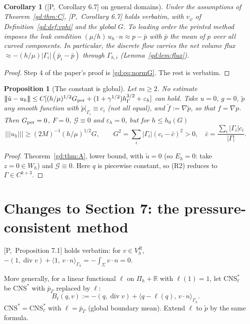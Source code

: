 \documentclass[11pt,reqno]{amsart}
\theoremstyle{plain}
\newtheorem{proposition}[theorem]{Proposition}
\newtheorem{corollary}[theorem]{Corollary}
\theoremstyle{definition}
\newcommand{\R}{\mathbb R}
\newcommand{\hG}{h_\Gamma}
\newcommand{\Gh}{\Gamma_h}
\newcommand{\VR}{V_h^R}
\newcommand{\Pih}{\Pi_h}
\newcommand{\Wh}{W_h}
\newcommand{\ut}{\tilde u}
\newcommand{\pt}{\tilde p}
\newcommand{\ft}{\tilde f}
\newcommand{\pbar}{\bar p}
\newcommand{\pbG}{\bar p_{\Gamma}}
\newcommand{\ip}[2]{\langle #1,\, #2\rangle}
\newcommand{\tnorm}[1]{|\!|\!|#1|\!|\!|}
\newcommand{\CNS}{\mathrm{CNS}^\ast}
\newcommand{\eps}{\varepsilon_h}
\renewcommand{\div}{\operatorname{div}}
\newcommand{\Gc}{\mathcal G}
\newcommand{\Pref}[1]{\textup{[P,~#1]}}
\begin{document}
\begin{corollary}[\Pref{Corollary 6.7} on general domains]\label{gd:cor:Bp}
Under the assumptions of Theorem~\ref{gd:thm:C}, \Pref{Corollary 6.7} holds verbatim, with $v_\varphi$ of Definition~\ref{gd:def:vphi} and the global $G$. To leading order the printed method imposes the leak condition $(\mu/h)\,u_h\cdot n\approx p-\pbar$ with $\pbar$ the mean of $p$ over \emph{all} curved components. In particular, the discrete flow carries the net volume flux $\approx-(h/\mu)|\Gamma_i|(\bar p_i-\pbar)$ through $\Gamma_{h,i}$ (Lemma~\ref{gd:lem:flux}).
\end{corollary}

\begin{proof}
Step 4 of the paper's proof is \eqref{gd:eq:normG}. The rest is verbatim.
\end{proof}

\begin{proposition}[The constant is global]\label{gd:prop:Gglobal}
Let $m\ge2$. No estimate $\tnorm{\ut-u_h}\le C[(h/\mu)^{1/2}G_{\rm per}+(1+\gamma^{1/2})\hG^{3/2}+\eps]$ can hold. Take $u=0$, $g=0$, $\pt$ any smooth function with $\pt|_{\Gamma_i}\equiv c_i$ (not all equal), and $\ft:=\nabla\pt$, so that $f=\nabla p$. Then $G_{\rm per}=0$, $F=0$, $\Gc\equiv0$ and $\eps=0$, but for $h\le h_0(G)$
\[
\tnorm{u_h}\ge(2M)^{-1}(h/\mu)^{1/2}G,\qquad G^2=\sum_i|\Gamma_i|(c_i-\bar c)^2>0,\quad\bar c=\frac{\sum_i|\Gamma_i|c_i}{|\Gamma|}.
\]
\end{proposition}

\begin{proof}
Theorem~\ref{gd:thm:A}, lower bound, with $\ut=0$ (so $E_h=0$: take $z=0\in\Wh$) and $\Gc\equiv0$. Here $q$ is piecewise constant, so (R2) reduces to $\Gamma\in C^{k+3}$.
\end{proof}

\section{Changes to Section 7: the pressure-consistent method}\label{gd:sec:D}

\Pref{Proposition 7.1} holds verbatim: for $v\in\VR$, $-(1,\div v)+\ip1{v\cdot n}_{\Gh}=-\int_\Sigma v\cdot n=0$.

More generally, for a linear functional $\ell$ on $\Pih+\R$ with $\ell(1)=1$, let $\CNS_\ell$ be $\CNS$ with $\pbG$ replaced by $\ell$:
\[
B_\ell(q,v):=-(q,\div v)+\ip{q-\ell(q)}{v\cdot n}_{\Gh}.
\]
$\CNS=\CNS_\ell$ with $\ell=\pbG$ (global boundary mean). Extend $\ell$ to $\pt$ by the same formula.
\end{document}
